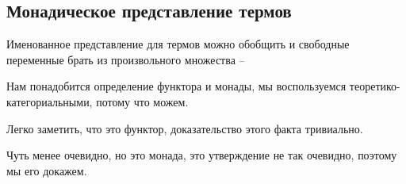 \subsection{Монадическое представление термов}

Именованное представление для термов можно обобщить и свободные переменные брать из произвольного множества -- \cite{bird1999bruijn}

Нам понадобится определение функтора и монады, мы воспользуемся теоретико-категориальными, потому что можем.

Легко заметить, что это функтор, доказательство этого факта тривиально.

Чуть менее очевидно, но это монада, это утверждение не так очевидно, поэтому мы его докажем.

